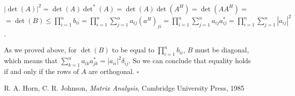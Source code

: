 \documentclass[12pt]{article}
\begin{document}
$\left\vert \det (A)\right\vert ^{2}=\det (A)\det^{\ast }(A)=\det (A)\det
(A^{H})=\det (AA^{H})=$\\
$=\det (B)\leq\prod_{i=1}^{n}b_{ii}=\prod_{i=1}^{n}\sum_{j=1}^{n}a_{ij}(a^{H})_{ji}=\prod_{i=1}^{n}\sum_{j=1}^{n}a_{ij}a_{ij}^{\ast
}=\prod_{i=1}^{n}\sum_{j=1}^{n}\left\vert a_{ij}\right\vert ^{2}$.

As we proved above, for $\det (B)$ to be equal to $\prod_{i=1}^{n}b_{ii}$, $B$ must be diagonal, which means that $\sum_{k=1}^{n}a_{ik}a_{jk}^{\ast }=|a_{ii}|^{2}\delta _{ij}$. So we can conclude that equality holds if and only if the rows of $A$ are orthogonal.
$\square $

\begin{thebibliography}{6}
 R. A. Horn, C. R. Johnson,
\emph{Matrix Analysis}, Cambridge University Press, 1985
\end{thebibliography}
\end{document}
